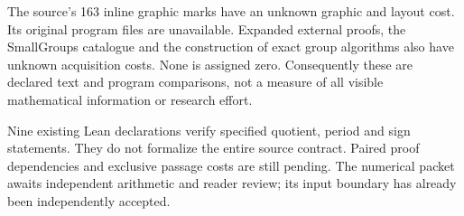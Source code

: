 \documentclass[a4paper,11pt]{article}
\begin{document}
The source's 163 inline graphic marks have an unknown graphic and layout
cost. Its original program files are unavailable. Expanded external
proofs, the SmallGroups catalogue and the construction of exact group
algorithms also have unknown acquisition costs. None is assigned zero.
Consequently these are declared text and program comparisons, not a
measure of all visible mathematical information or research effort.

Nine existing Lean declarations verify specified quotient, period and
sign statements. They do not formalize the entire source contract.
Paired proof dependencies and exclusive passage costs are still pending.
The numerical packet awaits independent arithmetic and reader review;
its input boundary has already been independently accepted.
\end{document}
